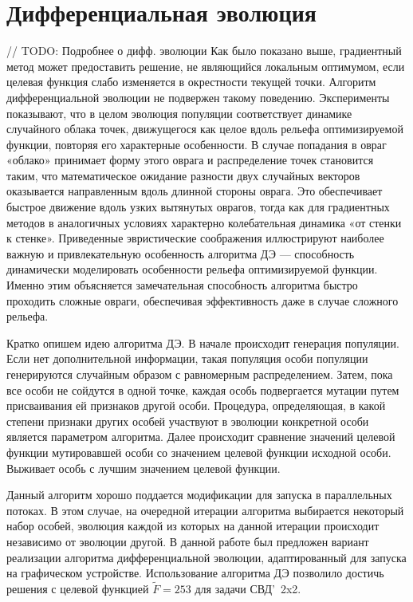 \chapter{Дифференциальная эволюция}\label{sec:radio}
// TODO: Подробнее о дифф. эволюции
Как было показано выше, градиентный метод может предоставить решение, не являющийся локальным оптимумом, если целевая функция слабо изменяется в окрестности текущей точки. Алгоритм дифференциальной эволюции не подвержен такому поведению.
Эксперименты показывают, что в целом эволюция популяции соответствует динамике случайного облака точек, движущегося как целое вдоль рельефа оптимизируемой функции, повторяя его характерные особенности. В случае попадания в овраг «облако» принимает форму этого оврага и распределение точек становится таким, что математическое ожидание разности двух случайных векторов оказывается направленным вдоль длинной стороны оврага. Это обеспечивает быстрое движение вдоль узких вытянутых оврагов, тогда как для градиентных методов в аналогичных условиях характерно колебательная динамика «от стенки к стенке». Приведенные эвристические соображения иллюстрируют наиболее важную и привлекательную особенность алгоритма ДЭ — способность динамически моделировать особенности рельефа оптимизируемой функции. Именно этим объясняется замечательная способность алгоритма быстро проходить сложные овраги, обеспечивая эффективность даже в случае сложного рельефа.

Кратко опишем идею алгоритма ДЭ. В начале происходит генерация популяции. Если нет дополнительной информации, такая популяция особи популяции генерируются случайным образом с равномерным распределением. Затем, пока все особи не сойдутся в одной точке, каждая особь подвергается мутации путем присваивания ей признаков другой особи. Процедура, определяющая, в какой степени признаки других особей участвуют в эволюции конкретной особи является параметром алгоритма. Далее происходит сравнение значений целевой функции мутировавшей особи со значением целевой функции исходной особи. Выживает особь с лучшим значением целевой функции.

Данный алгоритм хорошо поддается модификации для запуска в параллельных потоках. В этом случае, на очередной итерации алгоритма выбирается некоторый набор особей, эволюция каждой из которых на данной итерации происходит независимо от эволюции другой. В данной работе был предложен вариант реализации алгоритма дифференциальной эволюции, адаптированный для запуска на графическом устройстве. Использование алгоритма ДЭ позволило достичь решения с целевой функцией $\tilde{F} = 253$ для задачи СВД'~2x2.

